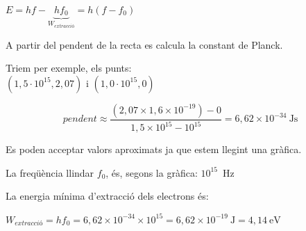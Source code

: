 \begin{solapartat}
\begin{minipage}[t]{0.5\linewidth}
 $E = hf - \underbrace{hf_0}_{W_\textit{extracció}} = h(f - f_0)$

\bigskip
A partir del pendent de la recta es calcula la constant de Planck.

\bigskip
Triem per exemple, els punts:\\
$(1,5\cdot 10^{15}, 2,07)$ i $(1,0\cdot 10^{15}, 0)$
\end{minipage}\hfill
\begin{minipage}[t]{0.46\linewidth}
\vspace{0pt}
\end{minipage}

\[ \mathit{pendent} \approx \frac{(2,07\times 1,6\times 10^{-19}) - 0}{1,5\times 10^{15} - 10^{15}} = 6,62\times 10^{-34}\ \mathrm{Js} \]

Es poden acceptar valors aproximats ja que estem llegint una gràfica.
\end{solapartat}

\begin{solapartat}
 La freqüència llindar $f_0$, és, segons la gràfica: $10^{15}$~Hz

La energia mínima d'extracció dels electrons és:

 $W_\textit{extracció} = hf_0 = 6,62\times 10^{-34}\times 10^{15} = 6,62\times 10^{-19}\ \mathrm{J} = 4,14\ \mathrm{eV}$
\end{solapartat}
